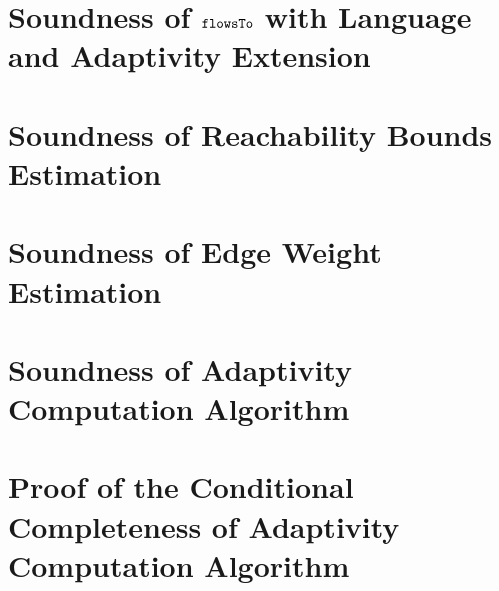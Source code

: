 \documentclass[a4paper,11pt]{article}
\newcommand{\highlight}[1]{\textcolor[rgb]{.0,0.0,1.0}{ #1}}
\begin{document}
\section{Soundness of $\mathtt{flowsTo}$ \highlight{with Language and Adaptivity Extension}}
\label{apdx:flowsto_soundness_extend}

\clearpage
% 
% 
% 
% 
\section{Soundness of Reachability Bounds Estimation}
\label{apdx:reachability_soundness}

\clearpage
\section{Soundness of Edge Weight Estimation}
\label{apdx:edgeweight_soundness}

\clearpage
% 
\section{Soundness of Adaptivity Computation Algorithm}
\label{apdx:adaptalg_soundness}

\section{Proof of the Conditional Completeness of Adaptivity Computation Algorithm}
\label{apdx:adaptalg_completeness}



\end{document}
